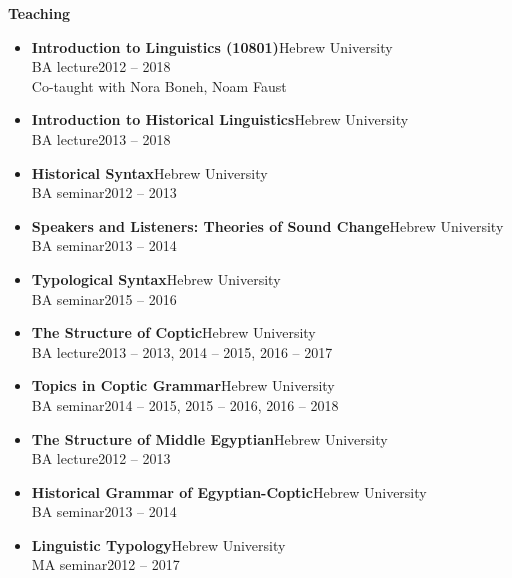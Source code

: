 \documentclass[letterpaper,11pt]{article}
\newcommand{\resheading}[1]{
\vspace*{6pt}
{\large \colorbox{mygrey}{\begin{minipage}{\textwidth}{\textbf{#1 \vphantom{p\^{E}}}}\end{minipage}}}
}
\begin{document}
\newpage
\resheading{Teaching} 
\begin{itemize}
\vspace{-0.025 in}
\vspace*{-4pt}

\item \textbf{Introduction to Linguistics (10801)}\hfill{Hebrew University}\\{BA lecture}\hfill{2012 -- 2018}\\Co-taught with Nora Boneh, Noam Faust 

\item \textbf{Introduction to Historical Linguistics}\hfill{Hebrew University}\\{BA lecture}\hfill{2013 -- 2018}

\item \textbf{Historical Syntax}\hfill{Hebrew University}\\{BA seminar}\hfill{2012 -- 2013}

\item \textbf{Speakers and Listeners: Theories of Sound Change}\hfill{Hebrew University}\\{BA seminar}\hfill{2013 -- 2014}
	
\item \textbf{Typological Syntax}\hfill{Hebrew University}\\{BA seminar}\hfill{2015 -- 2016}
	
\item \textbf{The Structure of Coptic}\hfill{Hebrew University}\\{BA lecture}\hfill{2013 -- 2013, 2014 -- 2015, 2016 -- 2017}

\item \textbf{Topics in Coptic Grammar}\hfill{Hebrew University}\\{BA seminar}\hfill{2014 -- 2015, 2015 -- 2016, 2016 -- 2018}

\item \textbf{The Structure of Middle Egyptian}\hfill{Hebrew University}\\{BA lecture}\hfill{2012 -- 2013}

\item \textbf{Historical Grammar of Egyptian-Coptic}\hfill{Hebrew University}\\{BA seminar}\hfill{2013 -- 2014}
	
\item \textbf{Linguistic Typology}\hfill{Hebrew University}\\{MA seminar}\hfill{2012 -- 2017}
	

\end{itemize}
\end{document}
